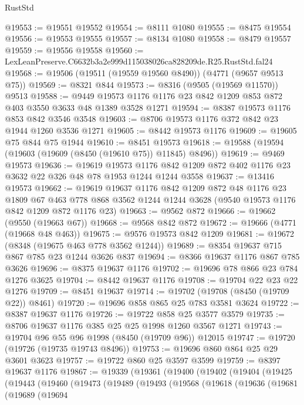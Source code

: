 \begin{lexlean}{RustStd}
\begin{coremodule}
@19553 := @19551 @19552
@19554 := @8111 @1080
@19555 := @8475 @19554
@19556 := @19553 @19555
@19557 := @8134 @1080
@19558 := @8479 @19557
@19559 := @19556 @19558
@19560 := LexLeanPreserve.C6632b3a2e999d115038026ca828209de.R25.RustStd.fal24
@19568 := @19506 (@19511 (@19559 @19560 @8490)) (@4771 (@9657 @9513 @75))
@19569 := @8321 @844
@19573 := @8316 (@9505 (@19569 @11570)) @9513
@19588 := @9449 @19573 @1176 @1176 @23 @842 @1209 @853 @872 @403 @3550 @3633 @48 @1389 @3528 @1271
@19594 := @8387 @19573 @1176 @853 @842 @3546 @3548
@19603 := @8706 @19573 @1176 @372 @842 @23 @1944 @1260 @3536 @1271
@19605 := @8442 @19573 @1176
@19609 := @19605 @75 @844 @75 @1944
@19610 := @8451 @19573
@19618 := @19588 (@19594 (@19603 (@19609 (@8450 (@19610 @75)) @11845) @8496))
@19619 := @9469 @19573
@19636 := @19619
    @19573
    @1176
    @842
    @1209
    @872
    @402
    @1176
    @23
    @3632
    @22
    @326
    @48
    @78
    @1953
    @1244
    @1244
    @3558
@19637 := @13416 @19573
@19662 := @19619
    @19637
    @1176
    @842
    @1209
    @872
    @48
    @1176
    @23
    @1809
    @67
    @463
    @778
    @868
    @3562
    @1244
    @1244
    @3628
    (@9540 @19573 @1176 @842 @1209 @872 @1176 @23)
@19663 := @9562 @872
@19666 := @19662 (@9550 (@19663 @67))
@19668 := @9568 @842 @872
@19672 := @19666 (@4771 (@19668 @48 @463))
@19675 := @9576 @19573 @842 @1209
@19681 := @19672 (@8348 (@19675 @463 @778 @3562 @1244))
@19689 := @8354 @19637 @715 @867 @785 @23 @1244 @3626 @837
@19694 := @8366 @19637 @1176 @867 @785 @3626
@19696 := @8375 @19637 @1176
@19702 := @19696 @78 @866 @23 @784 @1276 @3625
@19704 := @8442 @19637 @1176
@19708 := @19704 @22 @23 @22 @1276
@19709 := @8451 @19637
@19714 := @19702 (@19708 (@8450 (@19709 @22)) @8461)
@19720 := @19696 @858 @865 @25 @783 @3581 @3624
@19722 := @8387 @19637 @1176
@19726 := @19722 @858 @25 @3577 @3579
@19735 := @8706 @19637 @1176 @385 @25 @25 @1998 @1260 @3567 @1271
@19743 := @19704 @96 @55 @96 @1998 (@8450 (@19709 @96)) @12015
@19747 := @19720 (@19726 (@19735 @19743 @8496))
@19753 := @19696 @860 @864 @25 @29 @3601 @3623
@19757 := @19722 @860 @25 @3597 @3599
@19759 := @8397 @19637 @1176
@19867 := @19339
    (@19361
      (@19400
        (@19402
          (@19404
            (@19425
              (@19443
                (@19460
                  (@19473
                    (@19489
                      (@19493
                        (@19568
                          (@19618
                            (@19636
                              (@19681
                                (@19689
                                  (@19694

\end{coremodule}
\end{lexlean}
